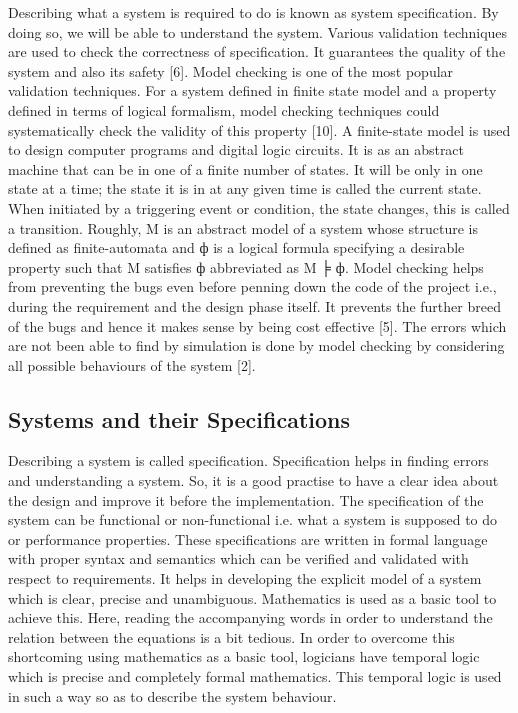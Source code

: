 \documentclass{article}
\begin{document}
Describing what a system is required to do is known as system specification. By doing so, we will be able to understand the system. Various validation techniques are used to check the correctness of specification. It guarantees the quality of the system and also its safety [6]. Model checking is one of the most popular validation techniques. For a system defined in finite state model and a property defined in terms of logical formalism, model checking techniques could systematically check the validity of this property [10]. A finite-state model is used to design computer programs and digital logic circuits. It is as an abstract machine that can be in one of a finite number of states. It will be only in one state at a time; the state it is in at any given time is called the current state. When initiated by a triggering event or condition, the state changes, this is called a transition.
Roughly, M is an abstract model of a system whose structure is defined as finite-automata and ф is a logical formula specifying a desirable property such that M satisfies ф abbreviated as M ╞ ф.
Model checking helps from preventing the bugs even before penning down the code of the project i.e., during the requirement and the design phase itself. It prevents the further breed of the bugs and hence it makes sense by being cost effective [5]. The errors which are not been able to find by simulation is done by model checking by considering all possible behaviours of the system [2].
\subsection{Systems and their Specifications}
Describing a system is called specification. Specification helps in finding errors and    understanding a system. So, it is a good practise to have a clear idea about the design and improve it before the implementation. The specification of the system can be functional or non-functional i.e. what a system is supposed to do or performance properties. These specifications are written in formal language with proper syntax and semantics which can be verified and validated with respect to requirements.
It helps in developing the explicit model of a system which is clear, precise and unambiguous. Mathematics is used as a basic tool to achieve this. Here, reading the accompanying words in order to understand the relation between the equations is a bit tedious. In order to overcome this shortcoming using mathematics as a basic tool, logicians have temporal logic which is precise and completely formal mathematics. This temporal logic is used in such a way so as to describe the system behaviour.
\end{document}

